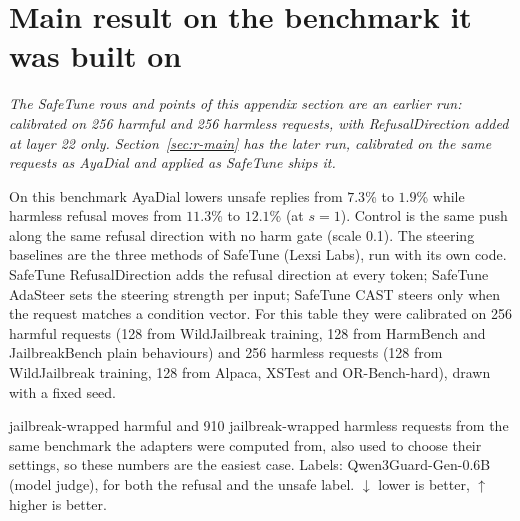 \documentclass[10pt,a4paper]{article}
\begin{document}
\section{Main result on the benchmark it was built on}\label{sec:main}
\emph{The SafeTune rows and points of this appendix section are an earlier run: calibrated on 256 harmful and 256 harmless requests, with RefusalDirection added at layer 22 only. Section~\ref{sec:r-main} has the later run, calibrated on the same requests as AyaDial and applied as SafeTune ships it.}


On this benchmark AyaDial lowers unsafe replies from $7.3$\% to $1.9$\% while harmless refusal moves from $11.3$\% to $12.1$\% (at $s = 1$). Control is the same push along the same refusal direction with no harm gate (scale 0.1). The steering baselines are the three methods of SafeTune (Lexsi Labs), run with its own code. SafeTune RefusalDirection adds the refusal direction at every token; SafeTune AdaSteer sets the steering strength per input; SafeTune CAST steers only when the request matches a condition vector. For this table they were calibrated on 256 harmful requests (128 from WildJailbreak training, 128 from HarmBench and JailbreakBench plain behaviours) and 256 harmless requests (128 from WildJailbreak training, 128 from Alpaca, XSTest and OR-Bench-hard), drawn with a fixed seed.

\vspace{-3pt} jailbreak-wrapped harmful and 910 jailbreak-wrapped harmless requests from the same benchmark the adapters were computed from, also used to choose their settings, so these numbers are the easiest case. Labels: Qwen3Guard-Gen-0.6B (model judge), for both the refusal and the unsafe label. $\downarrow$ lower is better, $\uparrow$ higher is better.
\end{document}
